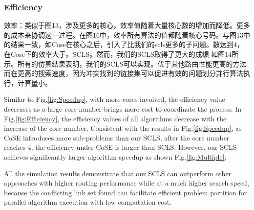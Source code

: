 \subsubsection{Efficiency}

效率：类似于图13，涉及更多的核心，效率值随着大量核心数的增加而降低。更多的成本来协调这一过程。在图16中，效率所有算法的值都随着核心号码。与图13中的结果一致，如Cose在核心之后，引入了比我们的scls更多的子问题。数达到4，在Cose下的效率大于。SCLS。然而，我们的SCLS取得了更大的成绩-如图14所示。所有的仿真结果表明，我们的SCLS可以实现。优于其他路由性能更高的方法而在更高的搜索速度，因为冲突找到的链接集可以促进有效的问题划分并行算法执行，计算量小。


Similar to Fig.\ref{fig:Speedup}, with more cores involved, the efficiency value decreases  as a large core number brings more cost to coordinate the process. In Fig.\ref{fig:Efficiency}, the efficiency values of all algorithms decrease with the increase of the core number. Consistent with the results in Fig.\ref{fig:Speedup}, as CoSE introduces more sub-problems than our SCLS, after the core number reaches 4, the efficiency under CoSE is larger than SCLS. However, our SCLS achieves significantly larger algorithm speedup as shown Fig.\ref{fig:Multiple}. %

All the simulation results demonstrate that our SCLS can outperform other approaches with higher routing performance while at a much higher search speed, because the  conflicting link set found can facilitate efficient problem partition for parallel algorithm execution with low computation cost.
